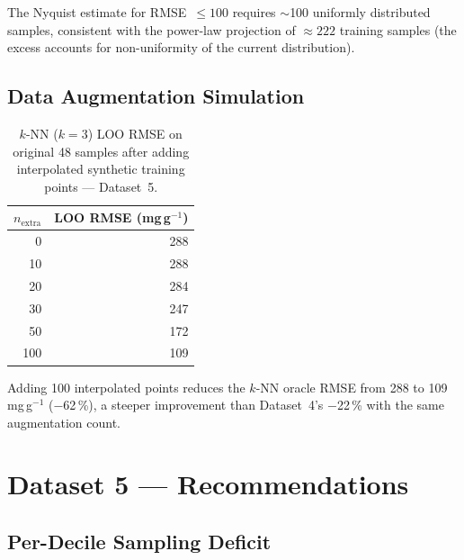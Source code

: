 \documentclass[12pt,a4paper]{article}
\begin{document}
The Nyquist estimate for RMSE~$\leq 100$ requires $\sim$100 uniformly
distributed samples, consistent with the power-law projection of
$\approx 222$ training samples (the excess accounts for non-uniformity
of the current distribution).

\subsection{Data Augmentation Simulation}

\begin{table}[h]
\centering
\caption{$k$-NN ($k=3$) LOO RMSE on original 48 samples after adding
  interpolated synthetic training points — Dataset~5.}
\label{tab:ds5_augmentation}
\begin{tabular}{rr}
\toprule
$n_\text{extra}$ & LOO RMSE (mg\,g$^{-1}$) \\
\midrule
  0 & 288 \\
 10 & 288 \\
 20 & 284 \\
 30 & 247 \\
 50 & 172 \\
100 & 109 \\
\bottomrule
\end{tabular}
\end{table}

Adding 100 interpolated points reduces the $k$-NN oracle RMSE from
288 to 109\,mg\,g$^{-1}$ ($-$62\,\%), a steeper improvement than
Dataset~4's $-$22\,\% with the same augmentation count.

\section{Dataset 5 — Recommendations}
\label{sec:ds5_recommendations}

\subsection{Per-Decile Sampling Deficit}
\end{document}
